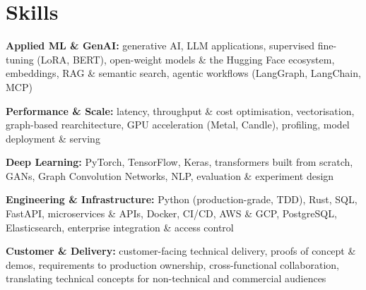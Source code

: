 \documentclass[10pt,a4paper]{article}
\begin{document}
\section{Skills}
\begin{tight}
  \item[\textcolor{accent}{\small$\bullet$}] \textbf{Applied ML \& GenAI:} generative AI, LLM applications, supervised fine-tuning (LoRA, BERT), open-weight models \& the Hugging Face ecosystem, embeddings, RAG \& semantic search, agentic workflows (LangGraph, LangChain, MCP)
  \item[\textcolor{accent}{\small$\bullet$}] \textbf{Performance \& Scale:} latency, throughput \& cost optimisation, vectorisation, graph-based rearchitecture, GPU acceleration (Metal, Candle), profiling, model deployment \& serving
  \item[\textcolor{accent}{\small$\bullet$}] \textbf{Deep Learning:} PyTorch, TensorFlow, Keras, transformers built from scratch, GANs, Graph Convolution Networks, NLP, evaluation \& experiment design
  \item[\textcolor{accent}{\small$\bullet$}] \textbf{Engineering \& Infrastructure:} Python (production-grade, TDD), Rust, SQL, FastAPI, microservices \& APIs, Docker, CI/CD, AWS \& GCP, PostgreSQL, Elasticsearch, enterprise integration \& access control
  \item[\textcolor{accent}{\small$\bullet$}] \textbf{Customer \& Delivery:} customer-facing technical delivery, proofs of concept \& demos, requirements to production ownership, cross-functional collaboration, translating technical concepts for non-technical and commercial audiences
\end{tight}

\end{document}
